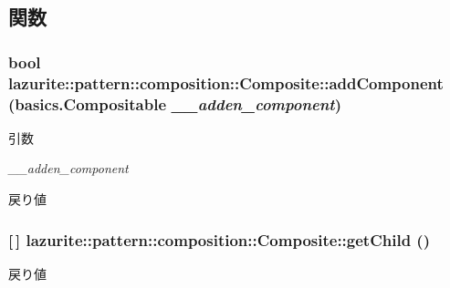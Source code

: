 \subsection{関数}
\hypertarget{classlazurite_1_1pattern_1_1composition_1_1_composite_af2e8b23c8776eb5f09f98c32d1044698}{
\subsubsection[{addComponent}]{\setlength{\rightskip}{0pt plus 5cm}bool lazurite::pattern::composition::Composite::addComponent ({\bf basics.Compositable} {\em \_\-\_\-adden\_\-component})}}
\label{classlazurite_1_1pattern_1_1composition_1_1_composite_af2e8b23c8776eb5f09f98c32d1044698}

\begin{DoxyParams}{引数}
\item[{\em \_\-\_\-adden\_\-component}]\end{DoxyParams}
\begin{DoxyReturn}{戻り値}

\end{DoxyReturn}
\hypertarget{classlazurite_1_1pattern_1_1composition_1_1_composite_a41bcfd17d90cfdae6befc1839657ee73}{
\subsubsection[{getChild}]{ \mbox{[}$\,$\mbox{]} lazurite::pattern::composition::Composite::getChild ()}}
\label{classlazurite_1_1pattern_1_1composition_1_1_composite_a41bcfd17d90cfdae6befc1839657ee73}
\begin{DoxyReturn}{戻り値}

\end{DoxyReturn}


